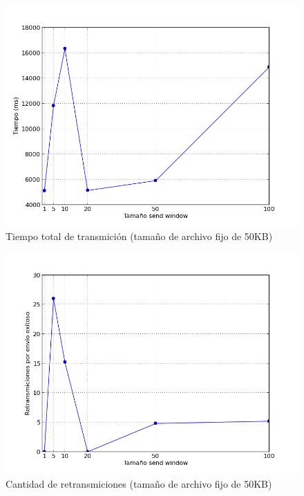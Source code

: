 \begin{figure}[H]
\begin{center}
\includegraphics[width=\textwidth,keepaspectratio]{tiempos50.png}
\end{center}
\caption{Tiempo total de transmición (tamaño de archivo fijo de 50KB)} \label{figura3}
\end{figure}

\begin{figure}[H]
\begin{center}
\includegraphics[width=\textwidth,keepaspectratio]{retransmiciones50.png}
\end{center}
\caption{Cantidad de retransmiciones (tamaño de archivo fijo de 50KB)} \label{figura4}
\end{figure}

